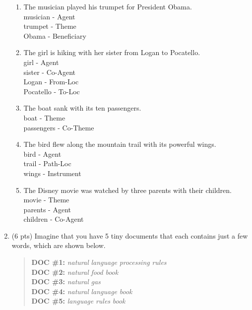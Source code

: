 \documentclass[11pt]{article}
\begin{document}
\begin{enumerate}
\begin{enumerate}
\item The musician played his trumpet for President Obama.   \\ 
musician - Agent \\
trumpet - Theme\\
Obama -  Beneficiary\\

\item The girl is hiking with her sister from Logan to Pocatello. \\ 
girl - Agent\\
sister - Co-Agent\\
Logan - From-Loc\\
Pocatello -  To-Loc\\

\item The boat sank with its ten passengers.  \\ 
boat - Theme\\
passengers -  Co-Theme\\

\item The bird flew along the mountain trail with its powerful
  wings. \\
  bird - Agent\\
  trail - Path-Loc\\
  wings -  Instrument\\

\item The Disney movie was watched by three parents with their
  children. \\ 
  movie - Theme\\
  parents - Agent\\
  children -  Co-Agent\\

\end{enumerate}


\newpage

\item (6 pts) Imagine that you have 5 tiny documents that each
  contains just a few words, which are shown below. 

\begin{quote}
\textbf{DOC \#1:} {\it natural} {\it language} {\it processing} {\it rules} \\
\textbf{DOC \#2:} {\it natural} {\it food} {\it book} \\
\textbf{DOC \#3:} {\it natural} {\it gas} \\
\textbf{DOC \#4:} {\it natural} {\it language} {\it book} \\
\textbf{DOC \#5:} {\it language} {\it rules} {\it book}
\end{quote}


\end{enumerate}
\end{document}

